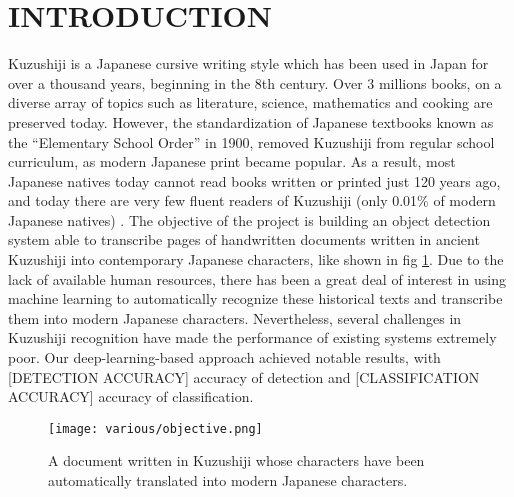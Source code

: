 \section{INTRODUCTION}
\label{sec:intro}

Kuzushiji is a Japanese cursive writing style which has been used in Japan for over a thousand years, beginning in the 8th century. Over 3 millions books, on a diverse array of topics such as literature, science, mathematics and cooking are preserved today. However, the standardization of Japanese textbooks known as the “Elementary School Order” in 1900, removed Kuzushiji from regular school curriculum, as modern Japanese print became popular. As a result, most Japanese natives today cannot read books written or printed just 120 years ago, and today there are very few fluent readers of Kuzushiji (only 0.01\% of modern Japanese natives) \cite{aboutkuz}. The objective of the project is building an object detection system able to transcribe pages of handwritten documents written in ancient Kuzushiji into contemporary Japanese characters, like shown in fig \ref{fig:objective}. Due to the lack of available human resources, there has been a great deal of interest in using machine learning to automatically recognize these historical texts and transcribe them into modern Japanese characters. Nevertheless, several challenges in Kuzushiji recognition have made the performance of existing systems extremely poor. Our deep-learning-based approach achieved notable results, with [DETECTION ACCURACY] accuracy of detection and [CLASSIFICATION ACCURACY] accuracy of classification.

\begin{figure}
	\centering
	\caption{A document written in Kuzushiji whose characters have been automatically translated into modern Japanese characters.}
	\texttt{[image: various/objective.png]}
	\label{fig:objective}
\end{figure}